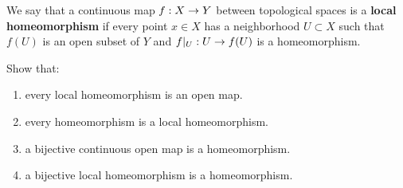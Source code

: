 \documentclass{mathnotes}
\begin{document}
\begin{defn}
    We say that a continuous map $f:X\rightarrow Y$ between topological spaces is a \textbf{local homeomorphism} if every point
    $x\in X$ has a neighborhood $U\subset X$ such that $f(U)$ is an open subset of $Y$ and $f|_U:U\rightarrow f(U)$ is a homeomorphism.
\end{defn}

\begin{exc}
    Show that:
    \begin{enumerate}
        \item every local homeomorphism is an open map.
        \item every homeomorphism is a local homeomorphism.
        \item a bijective continuous open map is a homeomorphism.
        \item a bijective local homeomorphism is a homeomorphism.
    \end{enumerate}
\end{exc}
\end{document}
